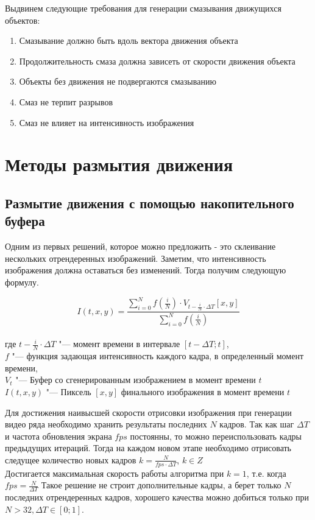 Выдвинем следующие требования для генерации смазывания движущихся объектов:

\begin{enumerate}
    \item Смазывание должно быть вдоль вектора движения объекта
    \item Продолжительность смаза должна зависеть от скорости движения объекта
    \item Объекты без движения не подвергаются смазыванию
    \item Смаз не терпит разрывов
    \item Смаз не влияет на интенсивность изображения
\end{enumerate}

\section{Методы размытия движения}

\subsection{Размытие движения с помощью накопительного буфера}

Одним из первых решений, которое можно предложить - это склеивание нескольких отрендеренных изображений.
Заметим, что интенсивность изображения должна оставаться без изменений. Тогда получим следующую формулу.


\begin{eqndesc}
    \begin{equation}\label{F:F202}
        I(t, x, y) = \frac{ \sum_{i=0}^{N} {f(\frac{i}{N}) \cdot V_{t- \frac{i}{N} \cdot \Delta T}[x,y] }}
        {\sum_{i=0}^{N} {f(\frac{i}{N}) }}
    \end{equation}
    \\
    где $t - \frac{i}{N} \cdot \Delta T$ "--- момент времени в интервале $[t-\Delta T; t]$,\\
    $f$ "--- функция задающая интенсивность каждого кадра, в определенный момент времени,\\
    $V_t$ "--- Буфер со сгенерированным изображением в момент времени $t$\\
    $I(t,x,y)$ "--- Пиксель $[x,y]$ финального изображения в момент времени $t$
\end{eqndesc}

Для достижения наивысшей скорости отрисовки изображения при генерации видео ряда необходимо хранить результаты последних $N$ кадров. Так как шаг $\Delta T$ и частота обновления экрана $fps$ постоянны, то можно переиспользовать кадры предыдущих итераций. Тогда на каждом новом этапе необходимо отрисовать следущее количество новых кадров  $k = \frac{N}{fps \cdot \Delta T}$, $k \in Z$
\\
Достигается максимальная скорость работы алгоритма при $k = 1$, т.е. когда $fps = \frac{N}{\Delta T}$
Такое решение не строит дополнительные кадры, а берет только $N$ последних отрендеренных кадров, хорошего качества можно добиться только при $N > 32, \Delta T \in [0; 1]$.

